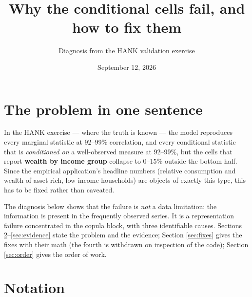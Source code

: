 \documentclass[11pt]{article}
\title{Why the conditional cells fail, and how to fix them}
\author{Diagnosis from the HANK validation exercise}
\date{September 12, 2026}
\begin{document}
\maketitle

\section{The problem in one sentence}

In the HANK exercise --- where the truth is known --- the model reproduces every
marginal statistic at 92--99\% correlation, and every conditional statistic that
is \emph{conditioned on} a well-observed measure at 92--99\%, but the cells that
report \textbf{wealth by income group} collapse to 0--15\% outside the bottom
half. Since the empirical application's headline numbers (relative consumption
and wealth of asset-rich, low-income households) are objects of exactly this
type, this has to be fixed rather than caveated.

The diagnosis below shows that the failure is \emph{not} a data limitation: the
information is present in the frequently observed series. It is a
representation failure concentrated in the copula block, with three identifiable
causes. Sections \ref{sec:notation}--\ref{sec:evidence} state the problem and
the evidence; Section \ref{sec:fixes} gives the fixes with their math (the
fourth is withdrawn on inspection of the code);
Section \ref{sec:order} gives the order of work.

\section{Notation}\label{sec:notation}
\end{document}
